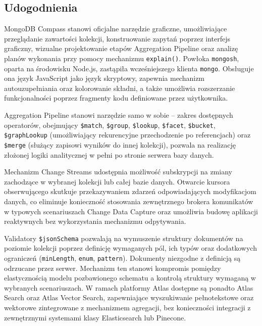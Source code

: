\subsection{Udogodnienia}

MongoDB Compass stanowi oficjalne narzędzie graficzne, umożliwiające
przeglądanie zawartości kolekcji, konstruowanie zapytań poprzez interfejs
graficzny, wizualne projektowanie etapów Aggregation Pipeline oraz analizę
planów wykonania przy pomocy mechanizmu \texttt{explain()}. Powłoka
\texttt{mongosh}, oparta na środowisku Node.js, zastąpiła wcześniejszego
klienta \texttt{mongo}. Obsługuje ona język JavaScript jako język skryptowy,
zapewnia mechanizm autouzupełniania oraz kolorowanie składni, a także
umożliwia rozszerzanie funkcjonalności poprzez fragmenty kodu definiowane
przez użytkownika.

Aggregation Pipeline stanowi narzędzie samo w sobie -- zakres dostępnych
operatorów, obejmujący \texttt{\$match}, \texttt{\$group}, \texttt{\$lookup},
\texttt{\$facet}, \texttt{\$bucket}, \texttt{\$graphLookup} (umożliwiający
rekurencyjne przechodzenie po referencjach) oraz \texttt{\$merge} (służący
zapisowi wyników do innej kolekcji), pozwala na realizację złożonej logiki
analitycznej w pełni po stronie serwera bazy danych.

Mechanizm Change Streams udostępnia możliwość subskrypcji na zmiany
zachodzące w wybranej kolekcji lub całej bazie danych. Otwarcie kursora
obserwującego skutkuje przekazywaniem zdarzeń odpowiadających modyfikacjom
danych, co eliminuje konieczność stosowania zewnętrznego brokera komunikatów
w typowych scenariuszach Change Data Capture oraz umożliwia budowę aplikacji
reaktywnych bez wykorzystania mechanizmu odpytywania.

Validatory \texttt{\$jsonSchema} pozwalają na wymuszenie struktury dokumentów
na poziomie kolekcji poprzez definicję wymaganych pól, ich typów oraz
dodatkowych ograniczeń (\texttt{minLength}, \texttt{enum}, \texttt{pattern}).
Dokumenty niezgodne z definicją są odrzucane przez serwer. Mechanizm ten
stanowi kompromis pomiędzy elastycznością modelu pozbawionego schematu
a kontrolą struktury wymaganą w wybranych scenariuszach. W ramach platformy
Atlas dostępne są ponadto Atlas Search oraz Atlas Vector Search, zapewniające
wyszukiwanie pełnotekstowe oraz wektorowe zintegrowane z mechanizmem
agregacji, bez konieczności integracji z zewnętrznymi systemami klasy
Elasticsearch lub Pinecone.
